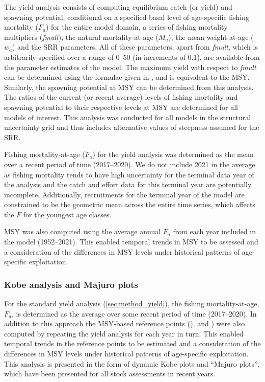 The yield analysis consists of computing equilibrium catch (or yield) and spawning potential, conditional on a specified basal level of age-specific fishing mortality ($F_a$) for the entire model domain, a series of fishing mortality multipliers (\emph{fmult}), the natural mortality-at-age ($M_a$), the mean weight-at-age ($w_a$) and the SRR parameters. All of these parameters, apart from \emph{fmult}, which is arbitrarily specified over a range of 0--50 (in increments of 0.1), are available from the parameter estimates of the model. The maximum yield with respect to \emph{fmult} can be determined using the formulae given in \citet{kleiber_multifan-cl_2019}, and is equivalent to the MSY. Similarly, the spawning potential at MSY \sbmsy can be determined from this analysis. The ratios of the current (or recent average) levels of fishing mortality and spawning potential to their respective levels at MSY are determined for all models of interest. This analysis was conducted for all models in the structural uncertainty grid and thus includes alternative values of steepness assumed for the SRR.

Fishing mortality-at-age ($F_a$) for the yield analysis was determined as the mean over a recent period of time (2017--2020). We do not include 2021 in the average as fishing mortality tends to have high uncertainty for the terminal data year of the analysis and the catch and effort data for this terminal year are potentially incomplete. Additionally, recruitments for the terminal year of the model are constrained to be the geometric mean across the entire time series, which affects the $F$ for the youngest age classes.

MSY was also computed using the average annual $F_a$ from each year included in the model (1952--2021). This enabled temporal trends in MSY to be assessed and a consideration of the differences in MSY levels under historical patterns of age-specific exploitation.

\subsubsection{Kobe analysis and Majuro plots}
\label{sec:method_kobe}

For the standard yield analysis (\autoref{sec:method_yield}), the fishing mortality-at-age, $F_a$, is determined as the average over some recent period of time (2017--2020). In addition to this approach the MSY-based reference points (\ftfmsy), and \sbtsbmsy) were also computed by repeating the yield analysis for each year in turn. This enabled temporal trends in the reference points to be estimated and a consideration of the differences in MSY levels under historical patterns of age-specific exploitation. This analysis is presented in the form of dynamic Kobe plots and ``Majuro plots'', which have been presented for all stock assessments in recent years.

